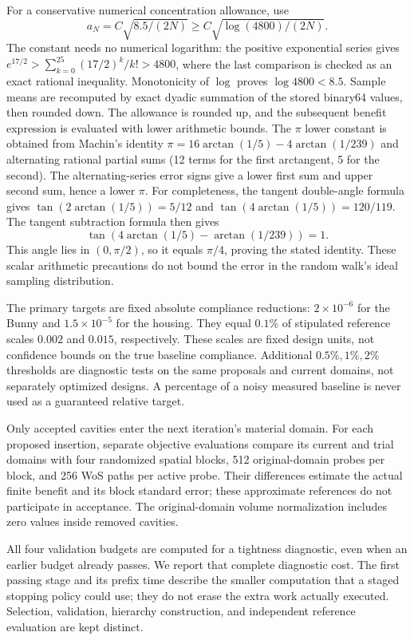 For a conservative numerical concentration allowance, use
\[
 a_N=C\sqrt{8.5/(2N)}
 \ge C\sqrt{\log(4800)/(2N)}.
\]
The constant needs no numerical logarithm: the positive exponential series
gives
$e^{17/2}>\sum_{k=0}^{25}(17/2)^k/k!>4800$, where the last comparison is
checked as an exact rational inequality.
Monotonicity of $\log$ proves $\log4800<8.5$.
Sample means are recomputed by exact dyadic summation of the stored
binary64 values, then rounded down. The allowance is rounded up, and the
subsequent benefit expression is evaluated with lower arithmetic bounds.
The $\pi$ lower constant is obtained from Machin's identity
$\pi=16\arctan(1/5)-4\arctan(1/239)$ and alternating rational partial sums
(12 terms for the first arctangent, 5 for the second). The alternating-series
error signs give a lower first sum and upper second sum, hence a lower
$\pi$. For completeness, the tangent double-angle formula gives
$\tan(2\arctan(1/5))=5/12$ and
$\tan(4\arctan(1/5))=120/119$. The tangent subtraction formula then gives
\[\tan(4\arctan(1/5)-\arctan(1/239))=1.\] This angle lies in $(0,\pi/2)$,
so it equals $\pi/4$, proving the stated identity. These scalar arithmetic precautions do not bound the error in the
random walk's ideal sampling distribution.

The primary targets are fixed absolute compliance reductions:
$2\times10^{-6}$ for the Bunny and $1.5\times10^{-5}$ for the housing.
They equal $0.1\%$ of stipulated reference scales $0.002$ and $0.015$,
respectively. These scales are fixed design units, not confidence bounds on
the true baseline compliance. Additional $0.5\%,1\%,2\%$ thresholds are
diagnostic tests on the same proposals and current domains, not separately
optimized designs. A percentage of a noisy measured baseline is never used
as a guaranteed relative target.

Only accepted cavities enter the next iteration's material domain. For
each proposed insertion, separate objective evaluations compare its current
and trial domains with four randomized spatial blocks, 512 original-domain
probes per block, and 256 WoS paths per active probe. Their differences
estimate the actual finite benefit and its block standard error; these
approximate references do not participate in acceptance. The original-domain
volume normalization includes zero values inside removed cavities.

All four validation budgets are computed for a tightness diagnostic, even
when an earlier budget already passes. We report that complete diagnostic
cost. The first passing stage and its prefix time describe the smaller
computation that a staged stopping policy could use; they do not erase the
extra work actually executed. Selection, validation, hierarchy construction,
and independent reference evaluation are kept distinct.


